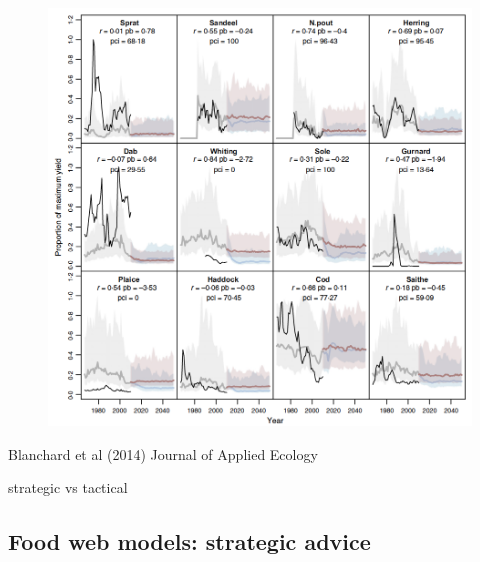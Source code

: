 \documentclass[
  letterpaper,
  DIV=11,
  numbers=noendperiod]{scrartcl}
\begin{document}
\begin{figure}

{\centering \includegraphics{images/blanch1.png}

}

\end{figure}

Blanchard et al (2014) Journal of Applied Ecology

strategic vs tactical

\hypertarget{food-web-models-strategic-advice-3}{%
\subsection{Food web models: strategic
advice}\label{food-web-models-strategic-advice-3}}
\end{document}
